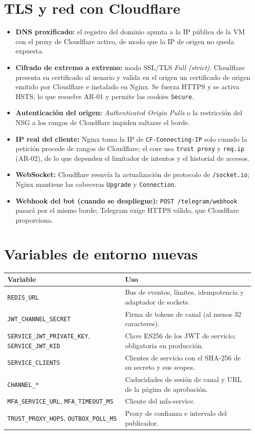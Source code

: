 \documentclass[11pt,a4paper]{report}
\begin{document}
\section{TLS y red con Cloudflare}
\begin{itemize}[leftmargin=*,itemsep=2pt]
\item \textbf{DNS proxificado:} el registro del dominio apunta a la IP pública de la VM con el proxy de Cloudflare activo, de modo que la IP de origen no queda expuesta.
\item \textbf{Cifrado de extremo a extremo:} modo SSL/TLS \emph{Full (strict)}. Cloudflare presenta su certificado al usuario y valida en el origen un certificado de origen emitido por Cloudflare e instalado en Nginx. Se fuerza HTTPS y se activa HSTS, lo que resuelve AR-01 y permite las cookies \texttt{Secure}.
\item \textbf{Autenticación del origen:} \emph{Authenticated Origin Pulls} o la restricción del NSG a los rangos de Cloudflare impiden saltarse el borde.
\item \textbf{IP real del cliente:} Nginx toma la IP de \texttt{CF-Connecting-IP} solo cuando la petición procede de rangos de Cloudflare; el core usa \texttt{trust proxy} y \texttt{req.ip} (AR-02), de lo que dependen el limitador de intentos y el historial de accesos.
\item \textbf{WebSocket:} Cloudflare reenvía la actualización de protocolo de \texttt{/socket.io}; Nginx mantiene las cabeceras \texttt{Upgrade} y \texttt{Connection}.
\item \textbf{Webhook del bot (cuando se despliegue):} \texttt{POST /telegram/webhook} pasará por el mismo borde; Telegram exige HTTPS válido, que Cloudflare proporciona.
\end{itemize}

\section{Variables de entorno nuevas}
\begin{center}
\small
\begin{tabularx}{\linewidth}{@{}lX@{}}
\toprule
Variable & Uso \\
\midrule
\texttt{REDIS\_URL} & Bus de eventos, límites, idempotencia y adaptador de sockets. \\
\texttt{JWT\_CHANNEL\_SECRET} & Firma de tokens de canal (al menos 32 caracteres). \\
\texttt{SERVICE\_JWT\_PRIVATE\_KEY}, \texttt{SERVICE\_JWT\_KID} & Clave ES256 de los JWT de servicio; obligatoria en producción. \\
\texttt{SERVICE\_CLIENTS} & Clientes de servicio con el SHA-256 de su secreto y sus scopes. \\
\texttt{CHANNEL\_*} & Caducidades de sesión de canal y URL de la página de aprobación. \\
\texttt{MFA\_SERVICE\_URL}, \texttt{MFA\_TIMEOUT\_MS} & Cliente del mfa-service. \\
\texttt{TRUST\_PROXY\_HOPS}, \texttt{OUTBOX\_POLL\_MS} & Proxy de confianza e intervalo del publicador. \\
\bottomrule
\end{tabularx}
\end{center}
\end{document}
